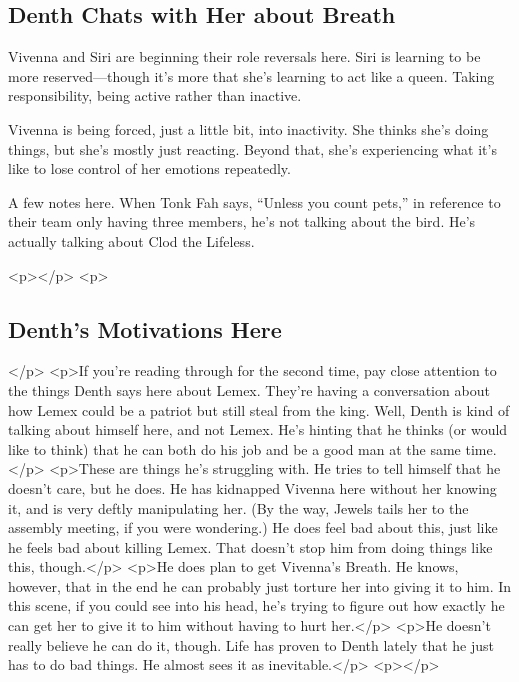 \subsection*{Denth Chats with Her about Breath}

Vivenna and Siri are beginning their role reversals here. Siri is learning to be more reserved—though it’s more that she’s learning to act like a queen. Taking responsibility, being active rather than inactive.

Vivenna is being forced, just a little bit, into inactivity. She thinks she’s doing things, but she’s mostly just reacting. Beyond that, she’s experiencing what it’s like to lose control of her emotions repeatedly.

A few notes here. When Tonk Fah says, “Unless you count pets,” in reference to their team only having three members, he’s not talking about the bird. He’s actually talking about Clod the Lifeless.



<p></p>
<p>\subsection*{Denth’s Motivations Here}</p>
<p>If you’re reading through for the second time, pay close attention to the things Denth says here about Lemex. They’re having a conversation about how Lemex could be a patriot but still steal from the king. Well, Denth is kind of talking about himself here, and not Lemex. He’s hinting that he thinks (or would like to think) that he can both do his job and be a good man at the same time.</p>
<p>These are things he’s struggling with. He tries to tell himself that he doesn’t care, but he does. He has kidnapped Vivenna here without her knowing it, and is very deftly manipulating her. (By the way, Jewels tails her to the assembly meeting, if you were wondering.) He does feel bad about this, just like he feels bad about killing Lemex. That doesn’t stop him from doing things like this, though.</p>
<p>He does plan to get Vivenna’s Breath. He knows, however, that in the end he can probably just torture her into giving it to him. In this scene, if you could see into his head, he’s trying to figure out how exactly he can get her to give it to him without having to hurt her.</p>
<p>He doesn’t really believe he can do it, though. Life has proven to Denth lately that he just has to do bad things. He almost sees it as inevitable.</p>
<p></p>



